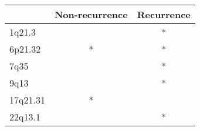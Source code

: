 \begin{tabular}{lcc}
\toprule
{} & Non-recurrence & Recurrence \\
\midrule
1q21.3   &                &          * \\
6p21.32  &              * &          * \\
7q35     &                &          * \\
9q13     &                &          * \\
17q21.31 &              * &            \\
22q13.1  &                &          * \\
\bottomrule
\end{tabular}
